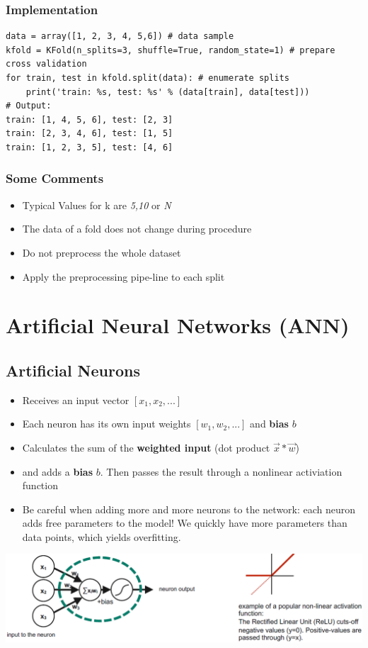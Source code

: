 \subsubsection{Implementation}
\begin{verbatim}
data = array([1, 2, 3, 4, 5,6]) # data sample
kfold = KFold(n_splits=3, shuffle=True, random_state=1) # prepare cross validation
for train, test in kfold.split(data): # enumerate splits
    print('train: %s, test: %s' % (data[train], data[test]))
# Output:
train: [1, 4, 5, 6], test: [2, 3]
train: [2, 3, 4, 6], test: [1, 5]
train: [1, 2, 3, 5], test: [4, 6]
\end{verbatim}

\subsubsection{Some Comments}
\begin{itemize}
    \item Typical Values for k are \textit{5,10} or \textit{N}
    \item The data of a fold does not change during procedure
    \item Do not preprocess the whole dataset
    \item Apply the preprocessing pipe-line to each split
\end{itemize}

\section{Artificial Neural Networks (ANN)}
\subsection{Artificial Neurons}
\begin{itemize}
    \item Receives an input vector $[x_1,x_2, ...]$
    \item Each neuron has its own input weights $[w_1, w_2, ...]$ and \textbf{bias} $b$
    \item Calculates the sum of the \textbf{weighted input} (\textit{}{dot product} $\vec{x} * \vec{w}$)
    \item and adds a \textbf{bias} $b$. Then passes the result through a nonlinear activiation function
    \item Be careful when adding more and more neurons to the network: each neuron adds free parameters to the model! We quickly have more parameters than data points, which yields overfitting. 
\end{itemize}
\includegraphics[width=\linewidth]{./img/artificial_neurons.png}

